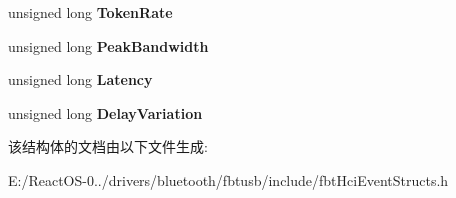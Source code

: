 \begin{DoxyCompactItemize}
unsigned long {\bfseries Token\+Rate}
\item 
\mbox{\label{struct_f_b_t___h_c_i___q_o_s___s_e_t_u_p___c_o_m_p_l_e_t_e_ac4a7360ccf13403e66936acea9a60b0f}} 
unsigned long {\bfseries Peak\+Bandwidth}
\item 
\mbox{\label{struct_f_b_t___h_c_i___q_o_s___s_e_t_u_p___c_o_m_p_l_e_t_e_a4f3bff5238a62c12c4549310b08f28b4}} 
unsigned long {\bfseries Latency}
\item 
\mbox{\label{struct_f_b_t___h_c_i___q_o_s___s_e_t_u_p___c_o_m_p_l_e_t_e_a757052d9b371aa04fc116d867ec9ba58}} 
unsigned long {\bfseries Delay\+Variation}
\end{DoxyCompactItemize}


该结构体的文档由以下文件生成\+:\begin{DoxyCompactItemize}
\item 
E\+:/\+React\+O\+S-\/0../drivers/bluetooth/fbtusb/include/fbt\+Hci\+Event\+Structs.\+h\end{DoxyCompactItemize}
